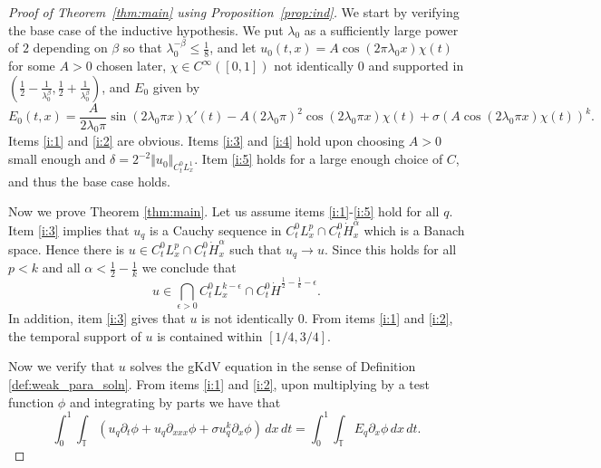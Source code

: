 \documentclass[12pt,reqno,letterpaper]{amsart}
\numberwithin{equation}{section}
\newcommand{\1}{{\bf 1}}
\newcommand{\2}{{\bf 2}}
\newcommand{\T}{\mathbb T}
\theoremstyle{remark}
\theoremstyle{remark}
\begin{document}
\begin{proof}[Proof of Theorem~\ref{thm:main} using Proposition~\ref{prop:ind}] We start by verifying the base case of the inductive hypothesis. We put $\lambda_0$ as a sufficiently large power of $2$ depending on $\beta$ so that $\lambda_0^{-\beta} \leq \frac{1}{8}$, and let
$u_0(t,x) = A \cos(2\pi \lambda_0 x)\chi(t)$ for some $A>0$ chosen later, $\chi \in C^\infty([0,1])$ not identically $0$ and supported in $\left(\frac{1}{2} - \frac{1}{ \lambda_0 ^\beta},\frac{1}{2}+\frac{1}{ \lambda_0 ^\beta}\right)$, and $E_0$ given by
$$
E_0(t,x) = \frac{A}{ 2\lambda_0 \pi} \sin(2 \lambda_0 \pi x) \chi'(t) - A(2 \lambda_0 \pi)^2 \cos(2 \lambda_0 \pi x)\chi(t) + \sigma\left(A \cos(2 \lambda_0 \pi x) \chi(t)\right)^k.
$$
Items \ref{i:1} and \ref{i:2} are obvious. Items \ref{i:3} and \ref{i:4} hold upon choosing $A > 0$ small enough and $\delta = 2^{-2}\Vert u_0 \Vert_{C_t^0L_x^1}$. Item \ref{i:5} holds for a large enough choice of $C$, and thus the base case holds.

Now we prove Theorem \ref{thm:main}. Let us assume items \ref{i:1}-\ref{i:5} hold for all $q$. Item \ref{i:3} implies that $u_q$ is a Cauchy sequence in $C_t^0 L^{p}_x \cap C_t^0 \dot{H}^{\alpha}_x$ which is a Banach space. Hence there is $u \in C_t^0 L^{p}_x \cap C_t^0 \dot{H}^{\alpha}_x$
such that $u_q \to u$. Since this holds for all $p < k$ and all $\alpha < \frac{1}{2} - \frac{1}{k}$ we conclude that
$$
u \in \bigcap_{\epsilon > 0} C_t^0 L^{k - \epsilon}_x \cap C_t^0 \dot{H}^{\frac{1}{2}-\frac{1}{k} - \epsilon}.
$$
In addition, item \ref{i:3} gives that $u$ is not identically $0$. From items \ref{i:1} and \ref{i:2}, the temporal support of $u$ is contained within $[1/4,3/4]$.

Now we verify that $u$ solves the \textsf{gKdV} equation in the sense of Definition \ref{def:weak_para_soln}. From items \ref{i:1} and \ref{i:2}, upon multiplying by a test function $\phi$ and integrating by parts we have that
\begin{equation}\label{eq:weak_form_relax}
    \int_0^1 \int_{\T} \left(u_q\partial_t\phi + u_q \partial_{xxx}\phi + \sigma u_q^k \partial_x\phi\right)\, dx \, dt = \int_0^1 \int_{\T} E_q \partial_x\phi\, dx\, dt.
\end{equation}


\end{proof}
\end{document}
